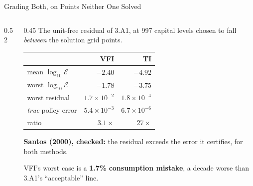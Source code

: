 \begin{frame}{Grading Both, on Points Neither One Solved}
\begin{columns}[c]
\begin{column}{0.52\textwidth}
\begin{tikzpicture}
\end{tikzpicture}
\end{column}
\begin{column}{0.45\textwidth}
\small
The unit-free residual of 3.A1, at 997 capital levels chosen to fall \emph{between} the solution grid points.
\medskip
\begin{center}\footnotesize
\begin{tabular}{@{}lrr@{}}
\toprule
 & VFI & TI \\
\midrule
mean $\log_{10}\mathcal{E}$ & $-2.40$ & $-4.92$ \\
worst $\log_{10}\mathcal{E}$ & $-1.78$ & $-3.75$ \\
\midrule
worst residual & $1.7\!\times\!10^{-2}$ & $1.8\!\times\!10^{-4}$ \\
\emph{true} policy error & $5.4\!\times\!10^{-3}$ & $6.7\!\times\!10^{-6}$ \\
ratio & $3.1\times$ & $27\times$ \\
\bottomrule
\end{tabular}
\end{center}
\vspace{-1mm}
{\footnotesize\textbf{Santos (2000), checked:} the residual exceeds the error it certifies, for both methods.}
\medskip
\begin{cautionbox}\footnotesize
VFI's worst case is a \textbf{1.7\% consumption mistake}, a decade worse than 3.A1's ``acceptable'' line.
\end{cautionbox}
\end{column}
\end{columns}
\end{frame}

